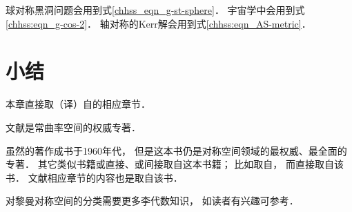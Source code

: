 \begin{remark}
    球对称黑洞问题会用到式\eqref{chhss_eqn_g-st-sphere}．
    宇宙学中会用到式\eqref{chhss:eqn_g-cos-2}．
    轴对称的Kerr解会用到式\eqref{chhss:eqn_AS-metric}．
\end{remark}





\section*{小结}
本章直接取（译）自\parencite{oneill1983,weinberg_grav-1972,
    wolf_SCC-2011,chen-li-2004v2}的相应章节．


文献\parencite{wolf_SCC-2011}是常曲率空间的权威专著．

虽然\textcite{helgason-2001}的著作成书于1960年代，
但是这本书仍是{\kaishu 对称空间}领域的最权威、最全面的专著．
其它类似书籍或直接、或间接取自这本书籍；
比如\parencite[Ch.9]{chen-li-2004v2}取自\parencite{mengdj-dckj-2005}，
而\parencite{mengdj-dckj-2005}直接取自该书．
文献\parencite{oneill1983}相应章节的内容也是取自该书．

对黎曼对称空间的分类需要更多李代数知识，
如读者有兴趣可参考\parencite{helgason-2001, chen-li-2004v2,mengdj-dckj-2005}．

\printbibliography[heading=subbibliography,title=第\ref{chhss}章参考文献]

\endinput






















